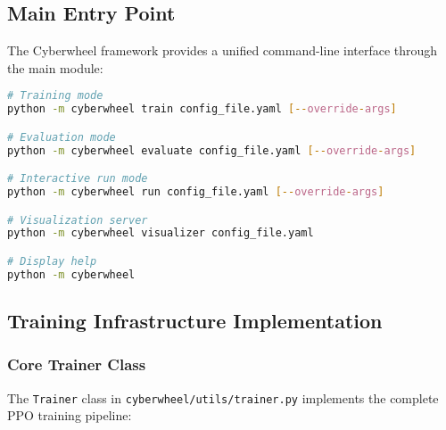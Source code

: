\documentclass[12pt,a4paper]{article}
\begin{document}
\subsection{Main Entry Point}

The Cyberwheel framework provides a unified command-line interface through the main module:

\begin{lstlisting}[language=bash, caption=Cyberwheel Command Line Usage]
# Training mode
python -m cyberwheel train config_file.yaml [--override-args]

# Evaluation mode  
python -m cyberwheel evaluate config_file.yaml [--override-args]

# Interactive run mode
python -m cyberwheel run config_file.yaml [--override-args]

# Visualization server
python -m cyberwheel visualizer config_file.yaml

# Display help
python -m cyberwheel
\end{lstlisting}

\subsection{Training Infrastructure Implementation}

\subsubsection{Core Trainer Class}
The \texttt{Trainer} class in \texttt{cyberwheel/utils/trainer.py} implements the complete PPO training pipeline:
\end{document}
